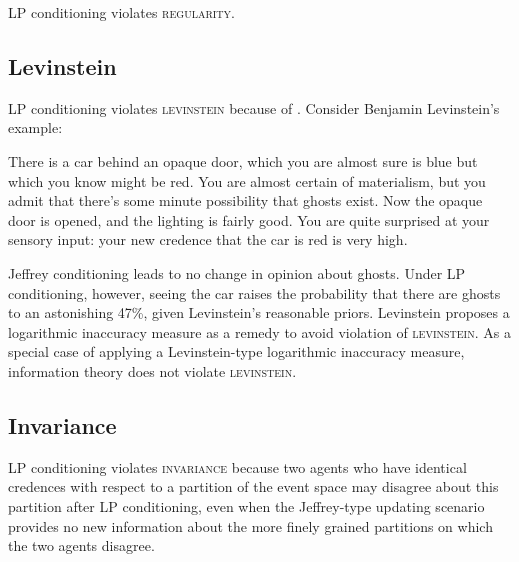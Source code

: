 \documentclass[smallextended]{svjour3}       %
\begin{document}
LP conditioning violates \textsc{regularity}.

\subsection{Levinstein}
\label{Levinstein}

LP conditioning violates \textsc{levinstein} because of 
. Consider Benjamin Levinstein's example:

\begin{quotex}
  \label{ex:levinstein} There is a car
  behind an opaque door, which you are almost sure is blue but which
  you know might be red. You are almost certain of materialism, but
  you admit that there's some minute possibility that ghosts exist.
  Now the opaque door is opened, and the lighting is fairly good. You
  are quite surprised at your sensory input: your new credence that
  the car is red is very high.
\end{quotex}

Jeffrey conditioning leads to no change in opinion about ghosts. Under
LP conditioning, however, seeing the car raises the probability that
there are ghosts to an astonishing 47\%, given Levinstein's reasonable
priors. Levinstein proposes a logarithmic inaccuracy measure as a
remedy to avoid violation of \textsc{levinstein}. As a special case of
applying a Levinstein-type logarithmic inaccuracy measure, information
theory does not violate \textsc{levinstein}.

\subsection{Invariance}
\label{Invariance}

LP conditioning violates \textsc{invariance} because two agents who
have identical credences with respect to a partition of the event
space may disagree about this partition after LP conditioning, even
when the Jeffrey-type updating scenario provides no new information
about the more finely grained partitions on which the two agents
disagree. 
\end{document}
